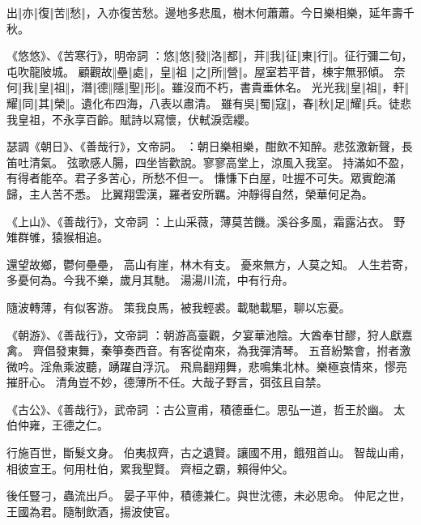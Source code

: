 \begin{pinyinscope}
 出‖亦‖復‖苦‖愁‖，入亦復苦愁。邊地多悲風，樹木何蕭蕭。今日樂相樂，延年壽千秋。


《悠悠》、《苦寒行》，明帝詞
 ：悠‖悠‖發‖洛‖都‖，茾‖我‖征‖東‖行‖。征行彌二旬，屯吹龍陂城。
 顧觀故‖壘‖處‖，皇‖祖
 ‖之‖所‖營‖。屋室若平昔，棟宇無邪傾。
 奈何‖我‖皇‖祖‖，潛‖德‖隱‖聖‖形‖。雖沒而不朽，書貴垂休名。
 光光我‖皇‖祖‖，軒‖耀‖同‖其‖榮‖。遺化布四海，八表以肅清。
 雖有吳‖蜀‖寇‖，春‖秋‖足‖耀‖兵。徒悲我皇祖，不永享百齡。賦詩以寫懷，伏軾淚霑纓。


瑟調《朝日》、《善哉行》，文帝詞。
 ：朝日樂相樂，酣飲不知醉。悲弦激新聲，長笛吐清氣。
 弦歌感人腸，四坐皆歡說。寥寥高堂上，涼風入我室。
 持滿如不盈，有得者能卒。君子多苦心，所愁不但一。
 慊慊下白屋，吐握不可失。眾賓飽滿歸，主人苦不悉。
 比翼翔雲漢，羅者安所羈。沖靜得自然，榮華何足為。


《上山》、《善哉行》，文帝詞
 ：上山采薇，薄莫苦饑。溪谷多風，霜露沾衣。
 野雉群雊，猿猴相追。


還望故鄉，鬱何壘壘，
 高山有崖，林木有支。
 憂來無方，人莫之知。
 人生若寄，多憂何為。今我不樂，歲月其馳。
 湯湯川流，中有行舟。


隨波轉薄，有似客游。
 策我良馬，被我輕裘。載馳載驅，聊以忘憂。


《朝游》、《善哉行》，文帝詞
 ：朝游高臺觀，夕宴華池陰。大酋奉甘醪，狩人獻嘉禽。
 齊倡發東舞，秦箏奏西音。有客從南來，為我彈清琴。
 五音紛繁會，拊者激微吟。淫魚乘波聽，踴躍自浮沉。
 飛鳥翻翔舞，悲鳴集北林。樂極哀情來，憀亮摧肝心。
  清角豈不妙，德薄所不任。大哉子野言，弭弦且自禁。


《古公》、《善哉行》，武帝詞
 ：古公亶甫，積德垂仁。思弘一道，哲王於幽。
 太伯仲雍，王德之仁。


行施百世，斷髮文身。
 伯夷叔齊，古之遺賢。讓國不用，餓殂首山。
 智哉山甫，相彼宣王。何用杜伯，累我聖賢。
 齊桓之霸，賴得仲父。


後任豎刁，蟲流出戶。
 晏子平仲，積德兼仁。與世沈德，未必思命。
 仲尼之世，王國為君。隨制飲酒，揚波使官。



\end{pinyinscope}
